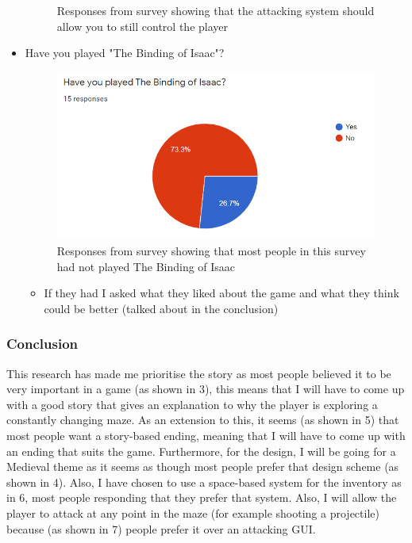 \documentclass{article}
\begin{document}
\begin{itemize}
\begin{figure}[htbp]
                        \caption{Responses from survey showing that the attacking system should allow you to still control the player}
                        \label{fig}
                    \end{figure}
                    \item Have you played "The Binding of Isaac"?
                    \begin{figure}[htbp]
                        \centerline{\includegraphics[scale=1]{img/Capture.PNG}}
                        \caption{Responses from survey showing that most people in this survey had not played The Binding of Isaac}
                        \label{fig}
                    \end{figure}
                    \begin{itemize}
                        \item If they had I asked what they liked about the game and what they think could be better (talked about in the conclusion)
                    \end{itemize}
                \end{itemize}
        \subsubsection{Conclusion}
            This research has made me prioritise the story as most people believed it to be very important in a game (as shown in \figurename{ 3}), this means that I will have to come up with a good story that gives an explanation to why the player is exploring a constantly changing maze. As an extension to this, it seems (as shown in \figurename{ 5}) that most people want a story-based ending, meaning that I will have to come up with an ending that suits the game. Furthermore, for the design, I will be going for a Medieval theme as it seems as though most people prefer that design scheme (as shown in \figurename{ 4}). Also, I have chosen to use a space-based system for the inventory as in \figurename{ 6}, most people responding that they prefer that system. Also, I will allow the player to attack at any point in the maze (for example shooting a projectile) because (as shown in \figurename{ 7}) people prefer it over an attacking GUI.
\end{document}
